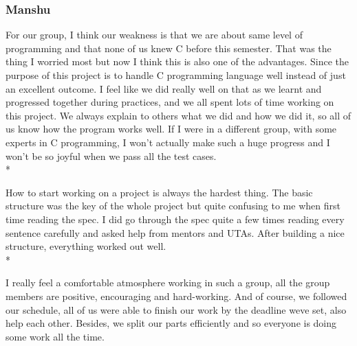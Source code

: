 \documentclass[letterpaper,11pt]{article}
\begin{document}
    \subsubsection{Manshu}
    For our group, I think our weakness is that we are about same level of programming and that none of us knew C before this semester. That was the thing I worried most but now I think this is also one of the advantages. Since the purpose of this project is to handle C programming language well instead of just an excellent outcome. I feel like we did really well on that as we learnt and progressed together during practices, and we all spent lots of time working on this project. We always explain to others what we did and how we did it, so all of us know how the program works well. If I were in a different group, with some experts in C programming, I won’t actually make such a huge progress and I won’t be so joyful when we pass all the test cases.\\*

    \noindent How to start working on a project is always the hardest thing. The basic structure was the key of the whole project but quite confusing to me when first time reading the spec. I did go through the spec quite a few times reading every sentence carefully and asked help from mentors and UTAs. After building a nice structure, everything worked out well.\\*

    \noindent I really feel a comfortable atmosphere working in such a group, all the group members are positive, encouraging and hard-working. And of course, we followed our schedule, all of us were able to finish our work by the deadline we\textquotesingle ve set, also help each other. Besides, we split our parts efficiently and so everyone is doing some work all the time.
\end{document}
